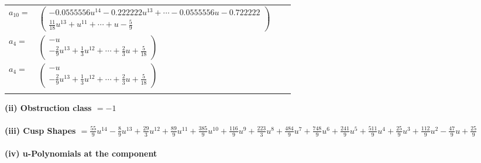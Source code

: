 \documentclass[1p]{elsarticle_modified}
\theoremstyle{definition}
\begin{document}
\begin{tabular}{m{7pt} m{180pt} m{7pt} m{180pt} }
\flushright $a_{10}=$&$\begin{pmatrix}-0.0555556 u^{14}-0.222222 u^{13}+\cdots-0.0555556 u-0.722222\\\frac{11}{18} u^{13}+u^{11}+\cdots+u-\frac{5}{9}\end{pmatrix}$ \\
\flushright $a_{4}=$&$\begin{pmatrix}- u\\-\frac{2}{9} u^{13}+\frac{1}{3} u^{12}+\cdots+\frac{2}{3} u+\frac{5}{18}\end{pmatrix}$\\ \flushright $a_{4}=$&$\begin{pmatrix}- u\\-\frac{2}{9} u^{13}+\frac{1}{3} u^{12}+\cdots+\frac{2}{3} u+\frac{5}{18}\end{pmatrix}$\\&\end{tabular}
\flushleft \textbf{(ii) Obstruction class $= -1$}\\~\\
\flushleft \textbf{(iii) Cusp Shapes $= \frac{55}{9} u^{14}-\frac{8}{9} u^{13}+\frac{29}{3} u^{12}+\frac{89}{9} u^{11}+\frac{385}{9} u^{10}+\frac{116}{9} u^9+\frac{223}{3} u^8+\frac{484}{9} u^7+\frac{748}{9} u^6+\frac{241}{9} u^5+\frac{511}{9} u^4+\frac{25}{9} u^3+\frac{112}{9} u^2-\frac{47}{9} u+\frac{25}{9}$}\\~\\
\newpage\renewcommand{\arraystretch}{1}
\flushleft \textbf{(iv) u-Polynomials at the component}\newline \\
\end{document}
